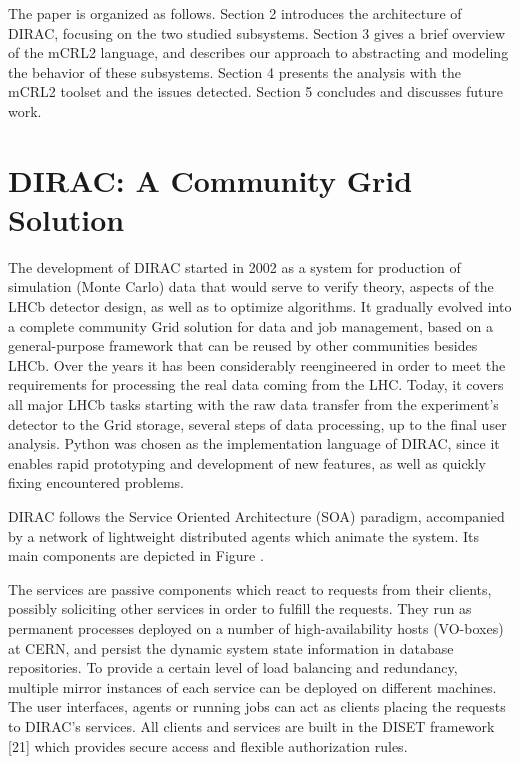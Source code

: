 \documentclass{IEEEtran}
\begin{document}
The paper is organized as follows. Section 2 introduces the architecture
of DIRAC, focusing on the two studied subsystems. Section 3 gives a brief
overview of the mCRL2 language, and describes our approach to abstracting
and modeling the behavior of these subsystems. Section 4 presents the
analysis with the mCRL2 toolset and the issues detected. Section 5
concludes and discusses future work. 

\section{DIRAC: A Community Grid Solution}


The development of DIRAC started in 2002 as a system for production
of simulation (Monte Carlo) data that would serve to verify theory,
aspects of the LHCb detector design, as well as to optimize algorithms. It
gradually evolved into a complete community Grid solution for data and job
management, based on a general-purpose framework that can be reused by
other communities besides LHCb. Over the years it has been considerably
reengineered in order to meet the requirements for processing the real
data coming from the LHC. Today, it covers all major LHCb tasks starting
with the raw data transfer from the experiment’s detector to the
Grid storage, several steps of data processing, up to the final user
analysis. Python was chosen as the implementation language of DIRAC,
since it enables rapid prototyping and development of new features,
as well as quickly fixing encountered problems.

DIRAC follows the Service Oriented Architecture (SOA) paradigm,
accompanied by a network of lightweight distributed agents which animate
the system. Its main components are depicted in Figure .

The services are passive components which react to requests from their
clients, possibly soliciting other services in order to fulfill the
requests. They run as permanent processes deployed on a number of
high-availability hosts (VO-boxes) at CERN, and persist the dynamic
system state information in database repositories. To provide a certain
level of load balancing and redundancy, multiple mirror instances of each
service can be deployed on different machines. The user interfaces, agents
or running jobs can act as clients placing the requests to DIRAC’s
services. All clients and services are built in the DISET framework [21]
which provides secure access and flexible authorization rules.
\end{document}
